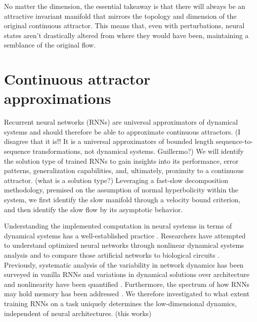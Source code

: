 \documentclass{article} %
\newcommand{\mpcomment}[1]{\textcolor{mpcolor}{(#1)}}
\newcounter{ct}
\theoremstyle{definition}
\theoremstyle{remark}
\begin{document}
No matter the dimension, the essential takeaway is that there will always be an attractive invariant manifold that mirrors the topology and dimension of the original continuous attractor. This means that, even with perturbations, neural states aren't drastically altered from where they would have been, maintaining a semblance of the original flow.








\section{Continuous attractor approximations} %

Recurrent neural networks (RNNs) are universal approximators of dynamical systems \citep{doya1993, schafer2006recurrent} and should therefore be able to approximate continuous attractors. \mpcomment{I disagree that it is!! It is a universal approximators of bounded length sequence-to-sequence transformations, not dynamical systems. Guillermo?}
We will identify the solution type of trained RNNs to gain insights into its performance, error patterns, generalization capabilities, and, ultimately, proximity to a continuous attractor.
\mpcomment{what is a solution type?}
Leveraging a fast-slow decomposition methodology, premised on the assumption of normal hyperbolicity within the system, we first identify the slow manifold through a velocity bound criterion, and then identify the slow flow by its asymptotic behavior.


Understanding the implemented computation in neural systems in terms of dynamical systems has a well-established practice \citep{seung1996, sompolinsky1988}.
Researchers have attempted to understand optimized neural networks through nonlinear dynamical systems analysis \citep{sussillo2013blackbox, sussillo2014, barak2013, driscoll2022, maheswaranathan2019universality, cueva2019headdirection, cueva2021continuous} and to compare those artificial networks to biological circuits \citep{mante2013context, remington2018flexible, ghazizadeh2021slow}.
% 
Previously, systematic analysis of the variability in network dynamics has been surveyed in vanilla RNNs and  variations in dynamical solutions over architecture and nonlinearity have been quantified \citep{sussillo2013blackbox,mante2013context,yang2019task,maheswaranathan2019universality,driscoll2022}.
Furthermore, the spectrum of  how RNNs may hold memory has been addressed \citep{orhan2019diverse}.
We therefore investigated to what extent training RNNs on a task uniquely determines the low-dimensional dynamics, independent of neural architectures.
\mpcomment{this works}
\end{document}
